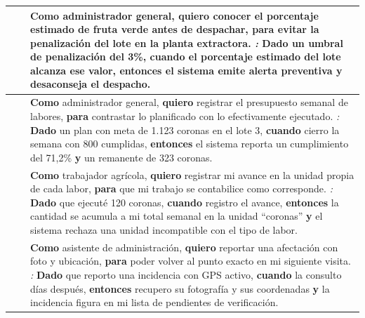 \begin{longtable}{|C{1.3cm}|C{1.3cm}|L{12.4cm}|}
 &  & \textbf{Como} administrador general, \textbf{quiero} conocer el porcentaje estimado de fruta verde antes de despachar, \textbf{para} evitar la penalización del lote en la planta extractora. \newline \emph{:} \textbf{Dado} un umbral de penalización del 3\%, \textbf{cuando} el porcentaje estimado del lote alcanza ese valor, \textbf{entonces} el sistema emite alerta preventiva \textbf{y} desaconseja el despacho. \\ \hline

 &  & \textbf{Como} administrador general, \textbf{quiero} registrar el presupuesto semanal de labores, \textbf{para} contrastar lo planificado con lo efectivamente ejecutado. \newline \emph{:} \textbf{Dado} un plan con meta de 1.123 coronas en el lote 3, \textbf{cuando} cierro la semana con 800 cumplidas, \textbf{entonces} el sistema reporta un cumplimiento del 71,2\% \textbf{y} un remanente de 323 coronas. \\ \hline

 &  & \textbf{Como} trabajador agrícola, \textbf{quiero} registrar mi avance en la unidad propia de cada labor, \textbf{para} que mi trabajo se contabilice como corresponde. \newline \emph{:} \textbf{Dado} que ejecuté 120 coronas, \textbf{cuando} registro el avance, \textbf{entonces} la cantidad se acumula a mi total semanal en la unidad ``coronas'' \textbf{y} el sistema rechaza una unidad incompatible con el tipo de labor. \\ \hline

 &  & \textbf{Como} asistente de administración, \textbf{quiero} reportar una afectación con foto y ubicación, \textbf{para} poder volver al punto exacto en mi siguiente visita. \newline \emph{:} \textbf{Dado} que reporto una incidencia con GPS activo, \textbf{cuando} la consulto días después, \textbf{entonces} recupero su fotografía y sus coordenadas \textbf{y} la incidencia figura en mi lista de pendientes de verificación. \\ \hline


\end{longtable}

